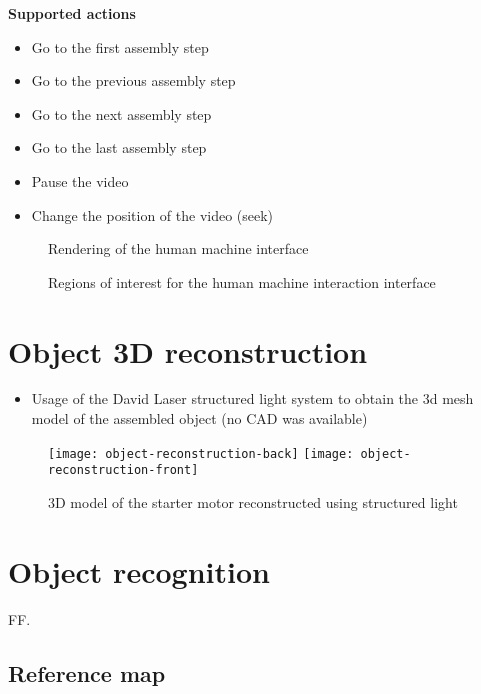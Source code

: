 \textbf{Supported actions}
\begin{itemize}
	\item Go to the first assembly step
	\item Go to the previous assembly step
	\item Go to the next assembly step
	\item Go to the last assembly step
	\item Pause the video
	\item Change the position of the video (seek)
\end{itemize}

\begin{figure}[H]
	\begin{floatrow}[2]
		{\caption{Rendering of the human machine interface}\label{fig:human-machine-interface}}
		{\caption{Regions of interest for the human machine interaction interface}\label{fig:interaction-rois}}
	\end{floatrow}
\end{figure}


\section{Object 3D reconstruction}

\begin{itemize}
	\item Usage of the David Laser structured light system to obtain the 3d mesh model of the assembled object (no CAD was available)
\end{itemize}

\begin{figure}[ht]
	\centering
	\texttt{[image: object-reconstruction-back]}
	\texttt{[image: object-reconstruction-front]}
	\caption{3D model of the starter motor reconstructed using structured light}
\end{figure}


\section{Object recognition}

FF.


\subsection{Reference map}

